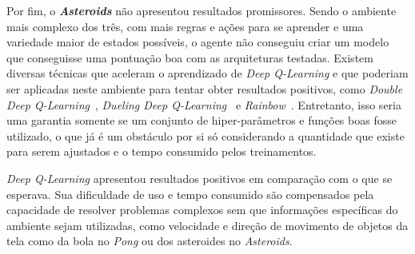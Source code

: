 Por fim, o \textbf{\textit{Asteroids}} não apresentou resultados promissores.
Sendo o ambiente mais complexo dos três, com mais regras e ações para se aprender e uma variedade maior de estados possíveis, o agente não conseguiu criar um modelo que conseguisse uma pontuação boa com as arquiteturas testadas.
Existem diversas técnicas que aceleram o aprendizado de \textit{Deep Q-Learning} e que poderiam ser aplicadas neste ambiente para tentar obter resultados positivos, como \textit{Double Deep Q-Learning}~\cite{DBLP:journals/corr/HasseltGS15}, \textit{Dueling Deep Q-Learning}~\cite{DBLP:journals/corr/WangFL15} e \textit{Rainbow}~\cite{DBLP:journals/corr/abs-1710-02298}.
Entretanto, isso seria uma garantia somente se um conjunto de hiper-parâmetros e funções boas fosse utilizado, o que já é um obstáculo por si só considerando a quantidade que existe para serem ajustados e o tempo consumido pelos treinamentos.

\textit{Deep Q-Learning} apresentou resultados positivos em comparação com o que se esperava.
Sua dificuldade de uso e tempo consumido são compensados pela capacidade de resolver problemas complexos sem que informações específicas do ambiente sejam utilizadas, como velocidade e direção de movimento de objetos da tela como da bola no \textit{Pong} ou dos asteroides no \textit{Asteroids}.
